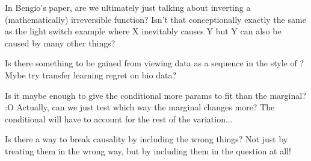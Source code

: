 \documentclass{article}
\begin{document}
In Bengio's paper, are we ultimately just talking about inverting a (mathematically) irreversible function?
Isn't that conceptionally exactly the same as the light switch example where X inevitably causes Y but Y can also be caused by many other things?

Is there something to be gained from viewing data as a sequence in the style of \cite{bengio2019meta}? Mybe try transfer learning regret on bio data?

Is it maybe enough to give the conditional more params to fit than the marginal? :O
Actually, can we just test which way the marginal changes more? The conditional will have to account for the rest of the variation...

Is there a way to break causality by including the wrong things? Not just by treating them in the wrong way, but by including them in the question at all!

\printbibliography
\end{document}
